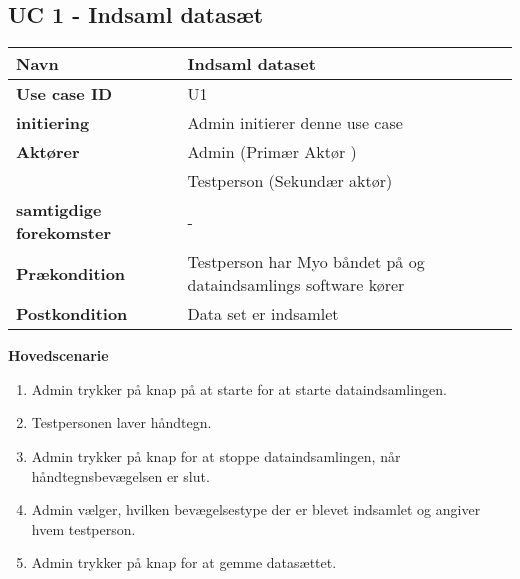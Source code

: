 \subsection{UC 1 - Indsaml datasæt}
\begin{table}[htbp] 
	\begin{tabular}{|p{5cm}|p{9cm}|}
		\hline
		\textbf{Navn} & Indsaml dataset \\ \hline
		\textbf{Use case ID} & U1 \\ \hline
		\textbf{initiering} & Admin initierer denne use case \\ \hline
		\textbf{Aktører} & Admin (Primær Aktør ) \\ & Testperson (Sekundær aktør) \\ \hline
		\textbf{samtigdige forekomster} & - \\ \hline
		\textbf{Prækondition} & Testperson har Myo båndet på og dataindsamlings software kører \\ \hline
		\textbf{Postkondition} & Data set er indsamlet \\ \hline
	\end{tabular}
\end{table}
\textbf{Hovedscenarie}
\begin{enumerate}
	\item Admin trykker på knap på at starte for at starte dataindsamlingen.
	\item Testpersonen laver håndtegn.
	\item Admin trykker på knap for at stoppe dataindsamlingen, når håndtegnsbevægelsen er slut.
	\item Admin vælger, hvilken bevægelsestype der er blevet indsamlet og angiver hvem testperson.
	\item Admin trykker på knap for at gemme datasættet.
\end{enumerate}

